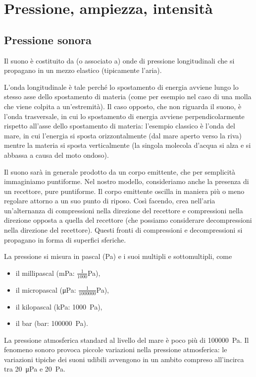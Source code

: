 
\chapter{Pressione, ampiezza, intensità}

\section{Pressione sonora}

Il suono è costituito da (o associato a) onde di pressione longitudinali che si propagano in un mezzo elastico (tipicamente l'aria).

L'onda longitudinale è tale perché lo spostamento di energia avviene lungo lo stesso asse dello spostamento di materia (come per esempio nel caso di una molla che viene colpita a un'estremità). Il caso opposto, che non riguarda il suono, è l'onda trasversale, in cui lo spostamento di energia avviene perpendicolarmente rispetto all'asse dello spostamento di materia: l'esempio classico è l'onda del mare, in cui l'energia si sposta orizzontalmente (dal mare aperto verso la riva) mentre la materia si sposta verticalmente (la singola molecola d'acqua si alza e si abbassa a causa del moto ondoso).

Il suono sarà in generale prodotto da un corpo emittente, che per semplicità immaginiamo puntiforme. Nel nostro modello, consideriamo anche la presenza di un recettore, pure puntiforme. Il corpo emittente oscilla in maniera più o meno regolare attorno a un suo punto di riposo. Così facendo, crea nell'aria un'alternanza di compressioni nella direzione del recettore e compressioni nella direzione opposta a quella del recettore (che possiamo considerare decompressioni nella direzione del recettore). Questi fronti di compressioni e decompressioni si propagano in forma di superfici sferiche. 

La pressione si misura in pascal (\unit{Pa}) e i suoi multipli e sottomultipli, come 
\begin{itemize}
\item il millipascal (\unit{mPa}: $\frac{1}{1000}$\unit{Pa}), 
\item il micropascal (\unit{\micro\pascal}: $\frac{1}{1000000}$\unit{Pa}), 
\item il kilopascal (\unit{\kilo\pascal}: \qty{1000}{Pa}),
\item il \unit{bar} (\unit{bar}: \qty{100000}{Pa}).
\end{itemize}

La pressione atmosferica standard al livello del mare è poco più di \qty{100000}{Pa}. Il fenomeno sonoro provoca piccole variazioni nella pressione atmosferica: le variazioni tipiche dei suoni udibili avvengono in un ambito compreso all'incirca tra \qty{20}{\micro\pascal} e \qty{20}{\pascal}. 

